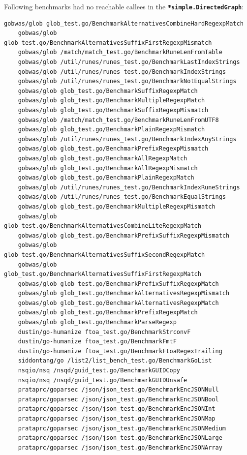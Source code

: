\documentclass{seal_thesis}
\begin{document}
\label{sameincsv1asincsv2}
Following benchmarks had no reachable callees in the \texttt{\textbf{*simple.DirectedGraph}}:
\begin{lstlisting}[basicstyle=\tiny]
	gobwas/glob glob_test.go/BenchmarkAlternativesCombineHardRegexpMatch
	gobwas/glob glob_test.go/BenchmarkAlternativesSuffixFirstRegexpMismatch
	gobwas/glob /match/match_test.go/BenchmarkRuneLenFromTable
	gobwas/glob /util/runes/runes_test.go/BenchmarkLastIndexStrings
	gobwas/glob /util/runes/runes_test.go/BenchmarkIndexStrings
	gobwas/glob /util/runes/runes_test.go/BenchmarkNotEqualStrings
	gobwas/glob glob_test.go/BenchmarkSuffixRegexpMatch
	gobwas/glob glob_test.go/BenchmarkMultipleRegexpMatch
	gobwas/glob glob_test.go/BenchmarkSuffixRegexpMismatch
	gobwas/glob /match/match_test.go/BenchmarkRuneLenFromUTF8
	gobwas/glob glob_test.go/BenchmarkPlainRegexpMismatch
	gobwas/glob /util/runes/runes_test.go/BenchmarkIndexAnyStrings
	gobwas/glob glob_test.go/BenchmarkPrefixRegexpMismatch
	gobwas/glob glob_test.go/BenchmarkAllRegexpMatch
	gobwas/glob glob_test.go/BenchmarkAllRegexpMismatch
	gobwas/glob glob_test.go/BenchmarkPlainRegexpMatch
	gobwas/glob /util/runes/runes_test.go/BenchmarkIndexRuneStrings
	gobwas/glob /util/runes/runes_test.go/BenchmarkEqualStrings
	gobwas/glob glob_test.go/BenchmarkMultipleRegexpMismatch
	gobwas/glob glob_test.go/BenchmarkAlternativesCombineLiteRegexpMatch
	gobwas/glob glob_test.go/BenchmarkPrefixSuffixRegexpMismatch
	gobwas/glob glob_test.go/BenchmarkAlternativesSuffixSecondRegexpMatch
	gobwas/glob glob_test.go/BenchmarkAlternativesSuffixFirstRegexpMatch
	gobwas/glob glob_test.go/BenchmarkPrefixSuffixRegexpMatch
	gobwas/glob glob_test.go/BenchmarkAlternativesRegexpMismatch
	gobwas/glob glob_test.go/BenchmarkAlternativesRegexpMatch
	gobwas/glob glob_test.go/BenchmarkPrefixRegexpMatch
	gobwas/glob glob_test.go/BenchmarkParseRegexp
	dustin/go-humanize ftoa_test.go/BenchmarkStrconvF
	dustin/go-humanize ftoa_test.go/BenchmarkFmtF
	dustin/go-humanize ftoa_test.go/BenchmarkFtoaRegexTrailing
	siddontang/go /list2/list_bench_test.go/BenchmarkGoList
	nsqio/nsq /nsqd/guid_test.go/BenchmarkGUIDCopy
	nsqio/nsq /nsqd/guid_test.go/BenchmarkGUIDUnsafe
	prataprc/goparsec /json/json_test.go/BenchmarkEncJSONNull
	prataprc/goparsec /json/json_test.go/BenchmarkEncJSONBool
	prataprc/goparsec /json/json_test.go/BenchmarkEncJSONInt
	prataprc/goparsec /json/json_test.go/BenchmarkEncJSONMap
	prataprc/goparsec /json/json_test.go/BenchmarkEncJSONMedium
	prataprc/goparsec /json/json_test.go/BenchmarkEncJSONLarge
	prataprc/goparsec /json/json_test.go/BenchmarkEncJSONArray

\end{lstlisting}
\end{document}
